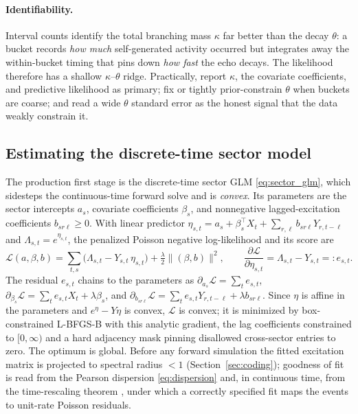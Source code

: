 \documentclass[11pt]{article}
\theoremstyle{plain}
\theoremstyle{definition}
\theoremstyle{remark}
\newcommand{\cL}{\mathcal{L}}
\begin{document}
\paragraph{Identifiability.}
Interval counts identify the total branching mass $\kappa$ far better than the decay $\theta$: a bucket records \emph{how much} self-generated activity occurred but integrates away the within-bucket timing that pins down \emph{how fast} the echo decays. The likelihood therefore has a shallow $\kappa$--$\theta$ ridge. Practically, report $\kappa$, the covariate coefficients, and predictive likelihood as primary; fix or tightly prior-constrain $\theta$ when buckets are coarse; and read a wide $\theta$ standard error as the honest signal that the data weakly constrain it.

\subsection{Estimating the discrete-time sector model}
\label{sec:est_sector}
The production first stage is the discrete-time sector GLM \eqref{eq:sector_glm}, which sidesteps the continuous-time forward solve and is \emph{convex}. Its parameters are the sector intercepts $a_s$, covariate coefficients $\beta_s$, and nonnegative lagged-excitation coefficients $b_{sr\ell}\ge0$. With linear predictor $\eta_{s,t}=a_s+\beta_s^\top X_t+\sum_{r,\ell}b_{sr\ell}Y_{r,t-\ell}$ and $\Lambda_{s,t}=e^{\eta_{s,t}}$, the penalized Poisson negative log-likelihood and its score are
\begin{equation}
\cL(a,\beta,b)=\sum_{t,s}\big(\Lambda_{s,t}-Y_{s,t}\,\eta_{s,t}\big)+\tfrac{\lambda}{2}\big\|(\beta,b)\big\|^2,
\qquad
\frac{\partial\cL}{\partial\eta_{s,t}}=\Lambda_{s,t}-Y_{s,t}=:e_{s,t}.
\label{eq:sector_ll}
\end{equation}
The residual $e_{s,t}$ chains to the parameters as $\partial_{a_s}\cL=\sum_t e_{s,t}$, $\partial_{\beta_s}\cL=\sum_t e_{s,t}X_t+\lambda\beta_s$, and $\partial_{b_{sr\ell}}\cL=\sum_t e_{s,t}Y_{r,t-\ell}+\lambda b_{sr\ell}$. Since $\eta$ is affine in the parameters and $e^{\eta}-Y\eta$ is convex, $\cL$ is convex; it is minimized by box-constrained L-BFGS-B with this analytic gradient, the lag coefficients constrained to $[0,\infty)$ and a hard adjacency mask pinning disallowed cross-sector entries to zero. The optimum is global. Before any forward simulation the fitted excitation matrix is projected to spectral radius $<1$ (Section~\ref{sec:coding}); goodness of fit is read from the Pearson dispersion \eqref{eq:dispersion} and, in continuous time, from the time-rescaling theorem \citep{ogata1988}, under which a correctly specified fit maps the events to unit-rate Poisson residuals.
\end{document}

